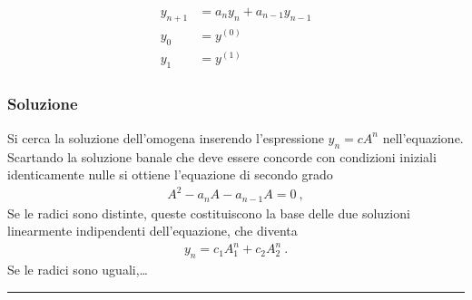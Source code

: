 \documentclass[letterpaper,10pt,italian]{jupyterBook}
\begin{document}
\begin{equation*}
\begin{split}\begin{aligned}
  y_{n+1} & = a_n y_n + a_{n-1} y_{n-1}  \\
  y_0     & = y^{(0)} \\
  y_1     & = y^{(1)}
\end{aligned}\end{split}
\end{equation*}\subsubsection*{Soluzione}

\sphinxAtStartPar
Si cerca la soluzione dell’omogena inserendo l’espressione \(y_n = c A^n\) nell’equazione. Scartando la soluzione banale \sphinxhyphen{} che deve essere concorde con condizioni iniziali identicamente nulle \sphinxhyphen{} si ottiene l’equazione di secondo grado
\begin{equation*}
\begin{split}A^{2} - a_n A - a_{n-1} A = 0 \ , \end{split}
\end{equation*}
\sphinxAtStartPar
Se le radici sono distinte, queste costituiscono la base delle due soluzioni linearmente indipendenti dell’equazione, che diventa
\begin{equation*}
\begin{split}y_n = c_1 A_1^n + c_2 A_2^n \ .\end{split}
\end{equation*}
\sphinxAtStartPar
Se le radici sono uguali,…\sphinxfootnotemark[1]


\bigskip\hrule\bigskip


\sphinxstepscope
\end{document}
